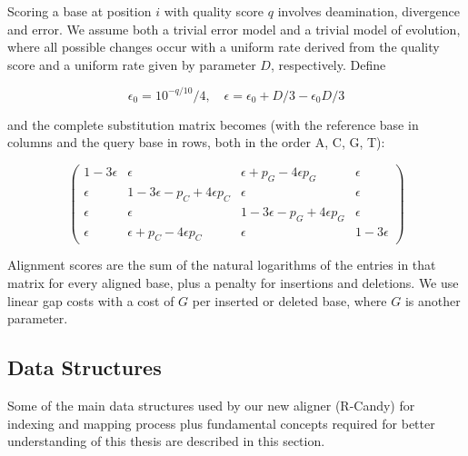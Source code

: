 \documentclass[11pt,a4paper]{report}
\begin{document}
Scoring a base at position $i$ with quality score $q$ involves
deamination, divergence and error.  We assume both a trivial error model
and a trivial model of evolution, where all possible changes occur with
a uniform rate derived from the quality score and a uniform rate given
by parameter $D$, respectively.  Define 

\begin{equation*}
\epsilon_0 = {10^{-q/10}}/4, \quad \epsilon = \epsilon_0 + D/3 - \epsilon_0 D/3
\end{equation*}

and the complete substitution matrix becomes (with the reference base in
columns and the
query base in rows, both in the order A, C, G, T):

\begin{equation*}
\left( \begin{array}{cccc}
1 - 3 \epsilon &       \epsilon                            &       \epsilon + p_{G} - 4 \epsilon p_{G} &       \epsilon \\
      \epsilon & 1 - 3 \epsilon - p_{C} + 4 \epsilon p_{C} &       \epsilon                            &       \epsilon \\
      \epsilon &       \epsilon                            & 1 - 3 \epsilon - p_{G} + 4 \epsilon p_{G} &       \epsilon \\
      \epsilon &       \epsilon + p_{C} - 4 \epsilon p_{C} &       \epsilon                            & 1 - 3 \epsilon 
\end{array} \right)
\end{equation*}

Alignment scores are the sum of the natural logarithms of the
entries in that matrix for every aligned base, plus a penalty for
insertions and deletions.  We use linear gap costs with a cost of $G$
per inserted or deleted base, where $G$ is another parameter.



\subsection{Data Structures}  \label{Data Structures}

Some of the main data structures used by our new aligner (R-Candy)
for indexing and mapping process plus fundamental concepts required
for better understanding of this thesis are described in this section. 
\end{document}

